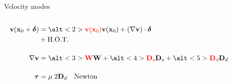 \documentclass{beamer}  %
\newcommand{\xx}{\mathbf{x}}
\newcommand{\vv}{\mathbf{v}}
\newcommand{\gam}{\boldsymbol{\dot \gamma}}
\begin{document}
\begin{frame}{Velocity modes}
    \begin{columns}[c]
        \begin{column}{.4\textwidth}
            \begin{align*}
                \vv(\xx_0 + \boldsymbol\delta)
                &= \alt<2>{{\color{red} \vv(\xx_0)}}{\vv(\xx_0)}
                + (\nabla \vv) \cdot \boldsymbol\delta\\
                &+ \text{H.O.T.}\\[12pt]
                \nabla \vv &= 
                \alt<3>{{\color{red} \mathbf{W}}}{\mathbf{W}}
                +\alt<4>{{\color{red} \mathbf{D}_s}}{\mathbf{D}_s}
                +\alt<5>{{\color{red} \mathbf{D}_d}}{\mathbf{D}_d}
                \\[12pt]
                \boldsymbol\tau &= \mu \; 2 \mathbf{D}_d \quad \text{Newton}
            \end{align*}
        \end{column}
        \begin{column}{.5\textwidth}
            \centering
            \begin{animateinline}{20}
\end{animateinline}
\end{column}
\end{columns}
\end{frame}
\end{document}
